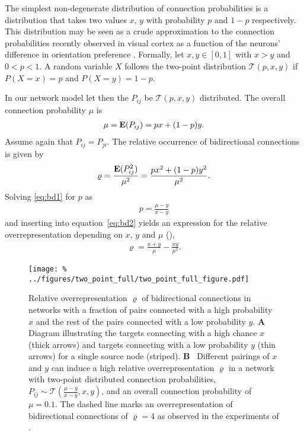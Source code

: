 
The simplest non-degenerate distribution of connection probabilities
is a distribution that takes two values $x$, $y$ with probability $p$
and $1-p$ respectively. %
%
This distribution may be seen as a crude approximation to the
connection probabilities recently observed in visual cortex as a
function of the neurons' difference in orientation preference
\cite{Lee2016}.
%
Formally, let $x,y \in [0,1]$ with $x > y$ and $0 < p
< 1$. A random variable $X$ follows the two-point distribution 
$\mathcal{T}(p,x,y)$ if $P(X=x)=p$ and $P(X=y) = 1-p$.
%

%
In our network model let then the $P_{ij}$ be $\mathcal{T}(p,x,y)$
distributed. The overall connection probability $\mu$ is
\begin{align}
\mu = \operatorname{\mathbf{E}}(P_{ij}) = px + (1-p)y. \label{eq:bd1}
\end{align}
Assume again that $P_{ij} = P_{ji}$. The relative occurrence of
bidirectional connections is given by
\begin{align}
  \varrho = \frac{\operatorname{\mathbf{E}}(P_{ij}^2)}{\mu^2} = \frac{p x^2 + (1-p) y^2}{\mu^2} \label{eq:bd2}.
\end{align}
Solving \eqref{eq:bd1} for $p$ as
\begin{align}
p = \frac{\mu - y}{x-y}
\end{align}
and inserting into
equation~\eqref{eq:bd2} yields an expression for the relative
overrepresentation depending on $x$, $y$ and $\mu$ (),
\begin{align}
\varrho = \frac{x+y}{\mu} - \frac{xy}{\mu^2}.
\end{align}

\begin{figure}[h!]
\centering
\texttt{[image: \%
  ../figures/two\_point\_full/two\_point\_full\_figure.pdf]}
\caption{Relative overrepresentation $\varrho$ of bidirectional
  connections in networks with a fraction of pairs connected with a
  high probability $x$ and the rest of the pairs connected with a low
  probability $y$. \textbf{A}~ Diagram illustrating the targets
  connecting with a high chance $x$ (thick arrows) and targets
  connecting with a low probability $y$ (thin arrows) for a single
  source node (striped). \textbf{B}~ Different pairings of $x$ and $y$
  can induce a high relative overrepresentation $\varrho$ in a network
  with two-point distributed connection probabilities, $P_{ij} \sim
  \mathcal{T}(\frac{\mu-y}{x-y},x,y)$, and an overall connection
  probability of $\mu = 0.1$. The dashed line marks an
  overrepresentation of bidirectional connections of $\varrho=4$ as
  observed in the experiments of \textcite{Song2005}.}
\label{fig:tp}
\end{figure}

